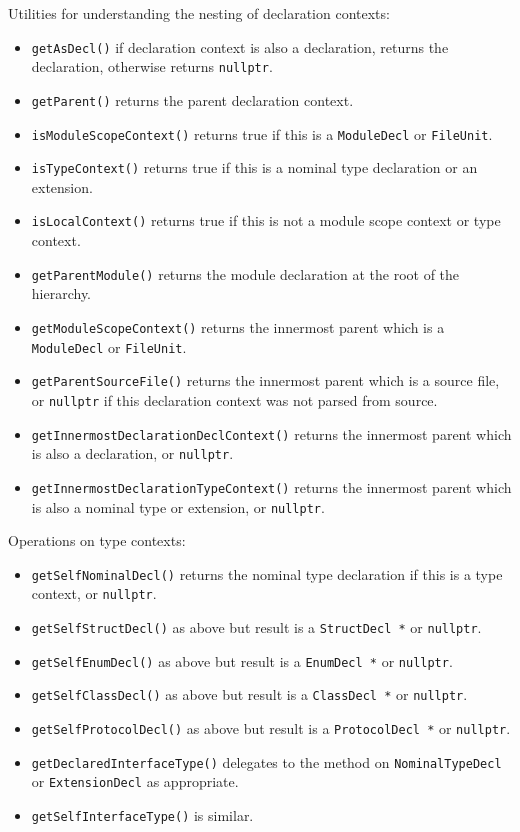 \documentclass[../generics]{subfiles}
\begin{document}
Utilities for understanding the nesting of declaration contexts:
\begin{itemize}
\item \texttt{getAsDecl()} if declaration context is also a declaration, returns the declaration, otherwise returns \texttt{nullptr}.
\item \texttt{getParent()} returns the parent declaration context.
\item \texttt{isModuleScopeContext()} returns true if this is a \texttt{ModuleDecl} or \texttt{FileUnit}.
\item \texttt{isTypeContext()} returns true if this is a nominal type declaration or an extension.
\item \texttt{isLocalContext()} returns true if this is not a module scope context or type context.
\item \texttt{getParentModule()} returns the module declaration at the root of the hierarchy.
\item \texttt{getModuleScopeContext()} returns the innermost parent which is a \texttt{ModuleDecl} or \texttt{FileUnit}.
\item \texttt{getParentSourceFile()} returns the innermost parent which is a source file, or \texttt{nullptr} if this declaration context was not parsed from source.
\item \texttt{getInnermostDeclarationDeclContext()} returns the innermost parent which is also a declaration, or \texttt{nullptr}.
\item \texttt{getInnermostDeclarationTypeContext()} returns the innermost parent which is also a nominal type or extension, or \texttt{nullptr}.
\end{itemize}
Operations on type contexts:
\begin{itemize}
\item \texttt{getSelfNominalDecl()} returns the nominal type declaration if this is a type context, or \texttt{nullptr}.
\item \texttt{getSelfStructDecl()} as above but result is a \texttt{StructDecl *} or \texttt{nullptr}.
\item \texttt{getSelfEnumDecl()} as above but result is a \texttt{EnumDecl *} or \texttt{nullptr}.
\item \texttt{getSelfClassDecl()} as above but result is a \texttt{ClassDecl *} or \texttt{nullptr}.
\item \texttt{getSelfProtocolDecl()} as above but result is a \texttt{ProtocolDecl *} or \texttt{nullptr}.
\item \texttt{getDeclaredInterfaceType()} delegates to the method on \texttt{NominalTypeDecl} or \texttt{ExtensionDecl} as appropriate.
\item \texttt{getSelfInterfaceType()} is similar.
\end{itemize}
\end{document}
